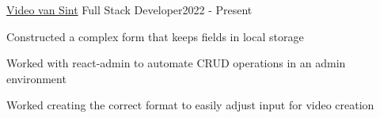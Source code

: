 \resumeSubheading
  {\href{https://www.videovansint.nl/}{Video van Sint}}{}
  {Full Stack Developer}{2022 - Present}
  \vspace{\experienceItemSpacing}
  \resumeItemListStart
\item Constructed a complex form that keeps fields in local storage
\item Worked with react-admin to automate CRUD operations in an admin environment
\item Worked creating the correct format to easily adjust input for video creation
  \resumeItemListEnd 